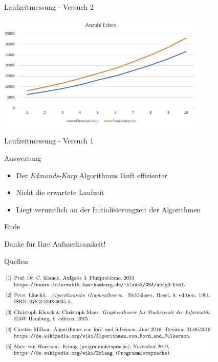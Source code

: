 \documentclass{beamer}
\begin{document}
    \begin{frame}{Laufzeitmessung - Versuch 2}
        \begin{center}
            \includegraphics[width=10cm]{../anzahl-kanten-graph.PNG}
        \end{center}
    \end{frame}

    \begin{frame}{Laufzeitmessung - Versuch 1}
        \begin{block}{Auswertung}
            \begin{itemize}
                \item Der \textit{Edmonds-Karp} Algorithmus l\"auft effizienter
                \item Nicht die erwartete Laufzeit
                \item Liegt vermutlich an der Initialisierungzeit der Algorithmen
            \end{itemize}
        \end{block}
    \end{frame}

    \begin{frame}{Ende}
        \begin{center}
            Danke f\"ur Ihre Aufmerksamkeit!
        \end{center}
    \end{frame}

    \begin{frame}{Quellen}
        \begin{center}
            \includegraphics[height=4.4cm]{../quellen.PNG}
        \end{center}
    \end{frame}
\end{document}
